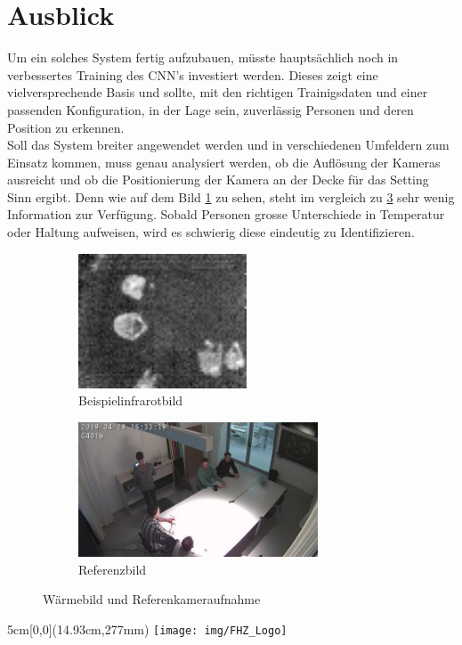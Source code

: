 \documentclass[
	a4paper
]{scrartcl}
\begin{document}
\section{Ausblick}
Um ein solches System fertig aufzubauen, müsste hauptsächlich noch in verbessertes Training des CNN's investiert werden. Dieses zeigt eine vielversprechende Basis und sollte, mit den richtigen Trainigsdaten und einer passenden Konfiguration, in der Lage sein, zuverlässig Personen und deren Position zu erkennen.\\
Soll das System breiter angewendet werden und in verschiedenen Umfeldern zum Einsatz kommen, muss genau analysiert werden, ob die Auflösung der Kameras ausreicht und ob die Positionierung der Kamera an der Decke für das Setting Sinn ergibt. Denn wie auf dem Bild \ref{fig:irexample} zu sehen, steht im vergleich zu \ref{fig:refexample} sehr wenig Information zur Verfügung. Sobald Personen grosse Unterschiede in Temperatur oder Haltung aufweisen, wird es schwierig diese eindeutig zu Identifizieren.

\begin{figure}[H]
	\begin{subfigure}{.5\linewidth}
		\centering
		\includegraphics[keepaspectratio, height=4cm]{exampleIRImage}
		\caption{Beispielinfrarotbild}
		\label{fig:irexample}
	\end{subfigure}
	\begin{subfigure}{.4\linewidth}
		\centering
		\includegraphics[keepaspectratio, height=4cm]{exampleGround}
		\caption{Referenzbild}
		\label{fig:refexample}
	\end{subfigure}
	\caption{Wärmebild und Referenkameraufnahme}
\end{figure}

\vspace{0.5em}
\noindent
\begin{textblock*}{5cm}[0,0](14.93cm,277mm)
	\texttt{[image: img/FHZ\_Logo]}
\end{textblock*}
\end{document}
